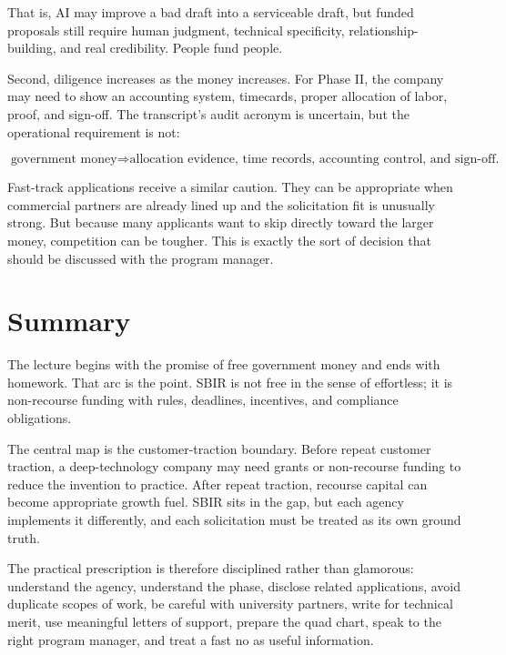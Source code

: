 That is, AI may improve a bad draft into a serviceable draft, but funded proposals still require human judgment, technical specificity, relationship-building, and real credibility. People fund people.

Second, diligence increases as the money increases. For Phase II, the company may need to show an accounting system, timecards, proper allocation of labor, proof, and sign-off. The transcript's audit acronym is uncertain, but the operational requirement is not:

\begin{equation}
\text{government money}
\Rightarrow
\text{allocation evidence, time records, accounting control, and sign-off.}
\end{equation}

Fast-track applications receive a similar caution. They can be appropriate when commercial partners are already lined up and the solicitation fit is unusually strong. But because many applicants want to skip directly toward the larger money, competition can be tougher. This is exactly the sort of decision that should be discussed with the program manager.

\section{Summary}

The lecture begins with the promise of free government money and ends with homework. That arc is the point. SBIR is not free in the sense of effortless; it is non-recourse funding with rules, deadlines, incentives, and compliance obligations.

The central map is the customer-traction boundary. Before repeat customer traction, a deep-technology company may need grants or non-recourse funding to reduce the invention to practice. After repeat traction, recourse capital can become appropriate growth fuel. SBIR sits in the gap, but each agency implements it differently, and each solicitation must be treated as its own ground truth.

The practical prescription is therefore disciplined rather than glamorous: understand the agency, understand the phase, disclose related applications, avoid duplicate scopes of work, be careful with university partners, write for technical merit, use meaningful letters of support, prepare the quad chart, speak to the right program manager, and treat a fast no as useful information.